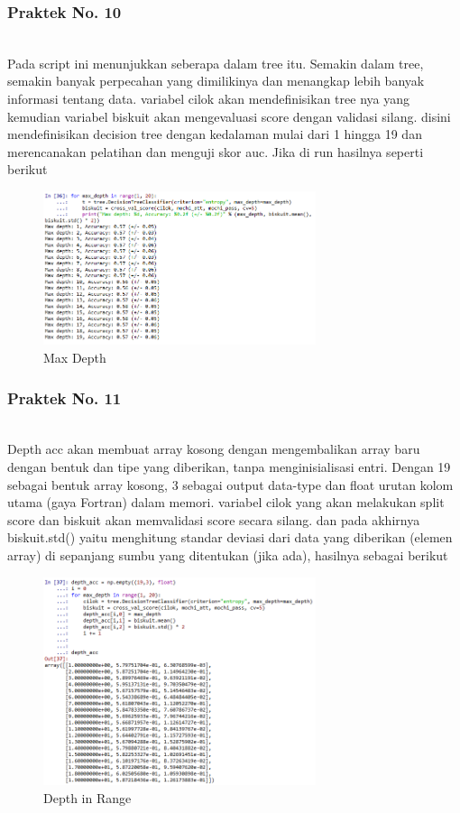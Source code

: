 \subsubsection{Praktek No. 10}
\hfill\\

Pada script ini menunjukkan seberapa dalam tree itu. Semakin dalam tree, semakin banyak perpecahan yang dimilikinya dan menangkap lebih banyak informasi tentang data. variabel cilok akan mendeﬁnisikan tree nya yang kemudian variabel biskuit akan mengevaluasi score dengan validasi silang. disini mendeﬁnisikan decision tree dengan kedalaman mulai dari 1 hingga 19 dan merencanakan pelatihan dan menguji skor auc. Jika di run hasilnya seperti berikut

\begin{figure}[H]
    \includegraphics[width=8cm]{figures/1174083/figures2/p10.png}
    \centering
    \caption{Max Depth}
\end{figure}

\subsubsection{Praktek No. 11}
\hfill\\

Depth acc akan membuat array kosong dengan mengembalikan array baru dengan bentuk dan tipe yang diberikan, tanpa menginisialisasi entri. Dengan 19 sebagai bentuk array kosong, 3 sebagai output data-type dan ﬂoat urutan kolom utama (gaya Fortran) dalam memori. variabel cilok yang akan melakukan split score dan biskuit akan memvalidasi score secara silang. dan pada akhirnya biskuit.std() yaitu menghitung standar deviasi dari data yang diberikan (elemen array) di sepanjang sumbu yang ditentukan (jika ada), hasilnya sebagai berikut

\begin{figure}[H]
    \includegraphics[width=8cm]{figures/1174083/figures2/p11.png}
    \centering
    \caption{Depth in Range}
\end{figure}

